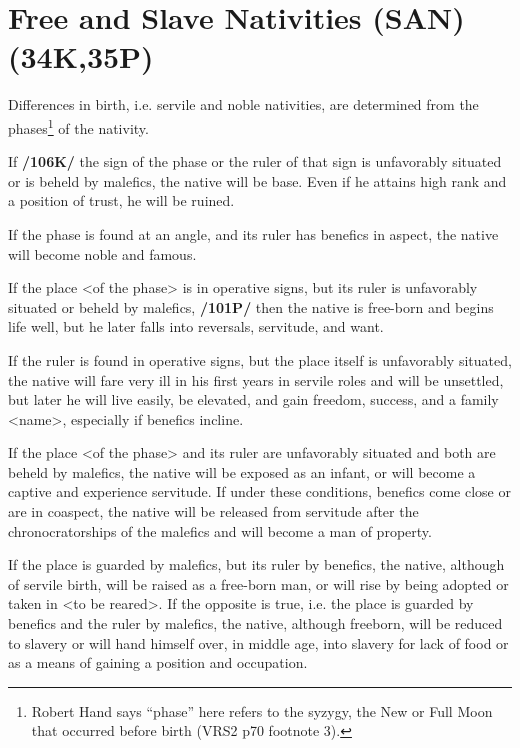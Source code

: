 \section{Free and Slave Nativities (SAN) (34K,35P)}
Differences in birth, i.e. servile and noble nativities, are determined from the phases\footnote{Robert Hand says ``phase'' here refers to the syzygy, the New or Full Moon that occurred before birth (VRS2 p70 footnote 3).} of the nativity.

If \textbf{/106K/} the sign of the phase or the ruler of that sign is unfavorably situated or is beheld by malefics, the
native will be base. Even if he attains high rank and a position of trust, he will be ruined. 

If the phase is found at an angle, and its ruler has benefics in aspect, the native will become noble and famous. 

If the place <of the phase> is in operative signs, but its ruler is unfavorably situated or beheld by malefics, \textbf{/101P/} then the native is free-born and begins life well, but he later falls into reversals, servitude, and want. 

If \mndl the ruler is found in operative signs, but the place itself is unfavorably situated, the native will fare very ill in his first years in servile roles and will be unsettled, but later he will live easily, be elevated, and gain freedom, success, and a family <name>, especially if benefics incline. 

If the place <of the phase> and its ruler are unfavorably situated and both are beheld by malefics, the native will be exposed as an infant, or will become a captive and experience servitude. If under these conditions, benefics come close or are in coaspect, the native will be released from servitude after the chronocratorships of the malefics and will become
a man of property. 

If the place is guarded by malefics, but its ruler by benefics, the native, although of servile birth, will be raised as a free-born man, or will rise by being adopted or taken in <to be reared>. If the opposite is true, i.e. the place is guarded by benefics and the ruler by malefics, the native, although freeborn, will be reduced to slavery or will hand himself over, in middle age, into slavery for lack of food or as a means of gaining a position and occupation.

\newpage